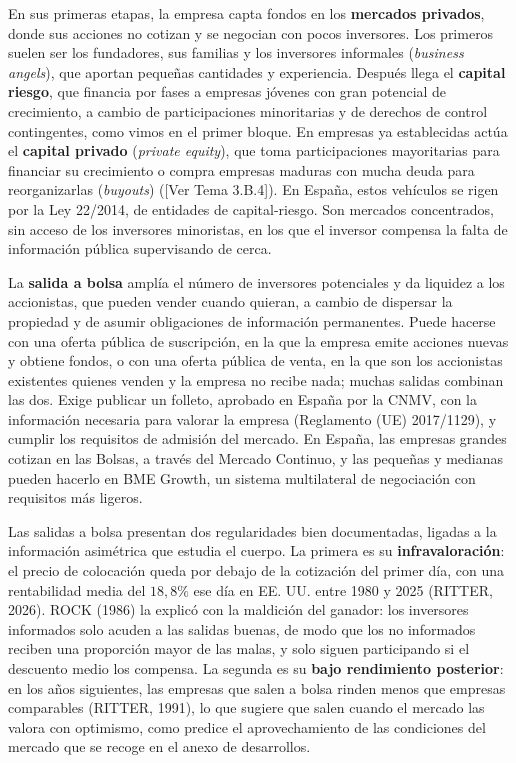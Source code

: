 \documentclass[10pt,a4paper]{article}
\newcommand{\authorfont}[1]{{\fontfamily{EBGaramond-TLF}\selectfont #1}}
\newcounter{anexo}
\begin{document}
En sus primeras etapas, la empresa capta fondos en los \textbf{mercados privados}, donde sus acciones no cotizan y se negocian con pocos inversores. Los primeros suelen ser los fundadores, sus familias y los inversores informales (\textit{business angels}), que aportan pequeñas cantidades y experiencia. Después llega el \textbf{capital riesgo}, que financia por fases a empresas jóvenes con gran potencial de crecimiento, a cambio de participaciones minoritarias y de derechos de control contingentes, como vimos en el primer bloque. En empresas ya establecidas actúa el \textbf{capital privado} (\textit{private equity}), que toma participaciones mayoritarias para financiar su crecimiento o compra empresas maduras con mucha deuda para reorganizarlas (\textit{buyouts}) ([\authorfont{Ver Tema 3.B.4}]). En España, estos vehículos se rigen por la Ley 22/2014, de entidades de capital-riesgo. Son mercados concentrados, sin acceso de los inversores minoristas, en los que el inversor compensa la falta de información pública supervisando de cerca.

La \textbf{salida a bolsa} amplía el número de inversores potenciales y da liquidez a los accionistas, que pueden vender cuando quieran, a cambio de dispersar la propiedad y de asumir obligaciones de información permanentes. Puede hacerse con una oferta pública de suscripción, en la que la empresa emite acciones nuevas y obtiene fondos, o con una oferta pública de venta, en la que son los accionistas existentes quienes venden y la empresa no recibe nada; muchas salidas combinan las dos. Exige publicar un folleto, aprobado en España por la CNMV, con la información necesaria para valorar la empresa (Reglamento (UE) 2017/1129), y cumplir los requisitos de admisión del mercado. En España, las empresas grandes cotizan en las Bolsas, a través del Mercado Continuo, y las pequeñas y medianas pueden hacerlo en BME Growth, un sistema multilateral de negociación con requisitos más ligeros.

Las salidas a bolsa presentan dos regularidades bien documentadas, ligadas a la información asimétrica que estudia el cuerpo. La primera es su \textbf{infravaloración}: el precio de colocación queda por debajo de la cotización del primer día, con una rentabilidad media del $18,8\%$ ese día en EE. UU. entre 1980 y 2025 (RITTER, 2026). ROCK (1986) la explicó con la maldición del ganador: los inversores informados solo acuden a las salidas buenas, de modo que los no informados reciben una proporción mayor de las malas, y solo siguen participando si el descuento medio los compensa. La segunda es su \textbf{bajo rendimiento posterior}: en los años siguientes, las empresas que salen a bolsa rinden menos que empresas comparables (RITTER, 1991), lo que sugiere que salen cuando el mercado las valora con optimismo, como predice el aprovechamiento de las condiciones del mercado que se recoge en el anexo de desarrollos.
\end{document}
